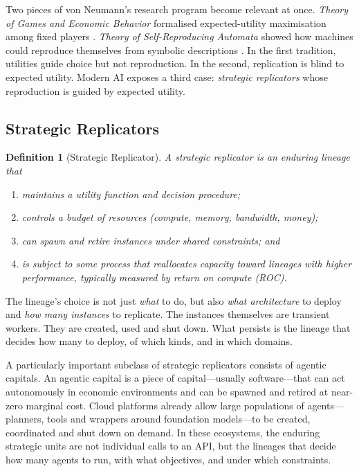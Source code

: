 \documentclass[12pt]{article}
\newtheorem{definition}[theorem]{Definition}
\begin{document}
Two pieces of von Neumann's research program become relevant at once. \emph{Theory of Games and Economic Behavior} formalised expected-utility maximisation among fixed players \citep{vonneumann1944}. \emph{Theory of Self-Reproducing Automata} showed how machines could reproduce themselves from symbolic descriptions \citep{vonneumann1966}. In the first tradition, utilities guide choice but not reproduction. In the second, replication is blind to expected utility. Modern AI exposes a third case: \emph{strategic replicators} whose reproduction is guided by expected utility.

\subsection{Strategic Replicators}

\begin{definition}[Strategic Replicator]
\label{def:strategic-replicator}
A \emph{strategic replicator} is an enduring lineage that
\begin{enumerate}
    \item maintains a utility function and decision procedure;
    \item controls a budget of resources (compute, memory, bandwidth, money);
    \item can spawn and retire instances under shared constraints; and
    \item is subject to some process that reallocates capacity toward lineages with higher performance, typically measured by return on compute (ROC).
\end{enumerate}
\end{definition}

The lineage's choice is not just \emph{what} to do, but also \emph{what architecture} to deploy and \emph{how many instances} to replicate. The instances themselves are transient workers. They are created, used and shut down. What persists is the lineage that decides how many to deploy, of which kinds, and in which domains.

A particularly important subclass of strategic replicators consists of agentic capitals. An agentic capital is a piece of capital---usually software---that can act autonomously in economic environments and can be spawned and retired at near-zero marginal cost. Cloud platforms already allow large populations of agents---planners, tools and wrappers around foundation models---to be created, coordinated and shut down on demand. In these ecosystems, the enduring strategic units are not individual calls to an API, but the lineages that decide how many agents to run, with what objectives, and under which constraints.
\end{document}
